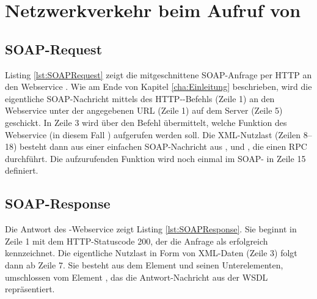 \chapter{Netzwerkverkehr beim Aufruf von }
\label{cha:SOAPNachrichten}

\section{SOAP-Request}
Listing \ref{lst:SOAPRequest} zeigt die mitgeschnittene SOAP-Anfrage per HTTP an den Webservice . Wie am Ende von Kapitel \ref{cha:Einleitung} beschrieben, wird die eigentliche SOAP-Nachricht mittels des HTTP--Befehls (Zeile 1) an den Webservice unter der angegebenen URL (Zeile 1) auf dem Server (Zeile 5) geschickt. In Zeile 3 wird über den Befehl  übermittelt, welche Funktion des Webservice (in diesem Fall ) aufgerufen werden soll. Die XML-Nutzlast (Zeilen 8--18) besteht dann aus einer einfachen SOAP-Nachricht aus ,  und , die einen RPC durchführt. Die aufzurufenden Funktion wird noch einmal im SOAP- in Zeile 15 definiert.


\lstset{language=XML, basicstyle=\footnotesize, showstringspaces=false, tabsize=2}


\section{SOAP-Response}
Die Antwort des -Webservice zeigt Listing \ref{lst:SOAPResponse}. Sie beginnt in Zeile 1 mit dem HTTP-Statuscode 200, der die Anfrage als erfolgreich kennzeichnet. Die eigentliche Nutzlast in Form von XML-Daten (Zeile 3) folgt dann ab Zeile 7. Sie besteht aus dem Element  und seinen Unterelementen, umschlossen vom Element , das die Antwort-Nachricht aus der WSDL repräsentiert.

\lstset{language=XML, basicstyle=\footnotesize, showstringspaces=false, tabsize=2}

